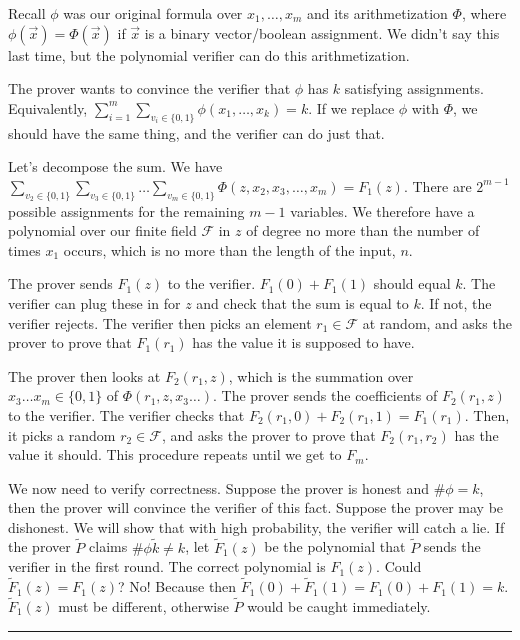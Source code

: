 \documentclass[twoside]{article}
\newenvironment{proof}{{\bf Proof:}}{\hfill\rule{2mm}{2mm}}
\begin{document}
\begin{proof}
Recall $\phi$ was our original formula over $x_1,\dots, x_m$ and its arithmetization $\Phi$, where $\phi(\vec{x})=\Phi(\vec{x})$ if $\vec{x}$ is a binary vector/boolean assignment.  We didn't say this last time, but the polynomial verifier can do this arithmetization.

The prover wants to convince the verifier that $\phi$ has $k$ satisfying assignments.  Equivalently, $\sum\limits_{i=1}^m\sum\limits_{v_i\in\{0,1\}}\phi(x_1,\dots,x_k)=k$.  If we replace $\phi$ with $\Phi$, we should have the same thing, and the verifier can do just that.

Let's decompose the sum.  We have $\sum\limits_{v_2\in\{0,1\}}\sum\limits_{v_3\in\{0,1\}}\dots \sum\limits_{v_m\in\{0,1\}} \Phi(z,x_2,x_3,\dots,x_m)=F_1(z)$.  There are $2^{m-1}$ possible assignments for the remaining $m-1$ variables.  We therefore have a polynomial over our finite field $\mathcal{F}$ in $z$ of degree no more than the number of times $x_1$ occurs, which is no more than the length of the input, $n$.

The prover sends $F_1(z)$ to the verifier. $F_1(0)+F_1(1)$ should equal $k$.  The verifier can plug these in for $z$ and check that the sum is equal to $k$.  If not, the verifier rejects.  The verifier then picks an element $r_1\in\mathcal{F}$ at random, and asks the prover to prove that $F_1(r_1)$ has the value it is supposed to have.

The prover then looks at $F_2(r_1,z)$, which is the summation over $x_3\dots x_m\in\{0,1\}$ of $\Phi(r_1,z,x_3\dots)$.  The prover sends the coefficients of $F_2(r_1,z)$ to the verifier.  The verifier checks that $F_2(r_1,0)+F_2(r_1,1)=F_1(r_1)$.  Then, it picks a random $r_2\in\mathcal{F}$, and asks the prover to prove that $F_2(r_1,r_2)$ has the value it should.  This procedure repeats until we get to $F_m$.

We now need to verify correctness.  Suppose the prover is honest and $\#\phi=k$, then the prover will convince the verifier of this fact.  Suppose the prover may be dishonest.  We will show that with high probability, the verifier will catch a lie.  If the prover $\tilde{P}$ claims $\#\phi\tilde{k}\neq k$, let  $\tilde{F}_1(z)$ be the polynomial that $\tilde{P}$ sends the verifier in the first round.  The correct polynomial is $F_1(z)$.  Could $\tilde{F}_1(z)=F_1(z)$?  No!  Because then $\tilde{F}_1(0) + \tilde{F}_1(1) = F_1(0)+F_1(1)=k$.  $\tilde{F}_1(z)$ must be different, otherwise $\tilde{P}$ would be caught immediately.


\end{proof}
\end{document}
